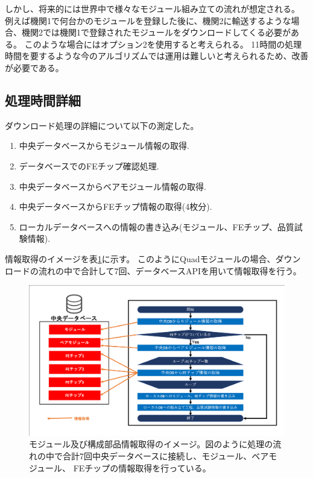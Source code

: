 しかし、将来的には世界中で様々なモジュール組み立ての流れが想定される。
例えば機関1で何台かのモジュールを登録した後に、機関2に輸送するような場合、機関2では機関1で登録されたモジュールをダウンロードしてくる必要がある。
このような場合にはオプション2を使用すると考えられる。
11時間の処理時間を要するような今のアルゴリズムでは運用は難しいと考えられるため、改善が必要である。

\subsection{処理時間詳細}
ダウンロード処理の詳細について以下の測定した。
\begin{enumerate}
  \item 中央データベースからモジュール情報の取得.
  \item データベースでのFEチップ確認処理.
  \item 中央データベースからベアモジュール情報の取得.
  \item 中央データベースからFEチップ情報の取得(4枚分).
  \item ローカルデータベースへの情報の書き込み(モジュール、FEチップ、品質試験情報).
\end{enumerate}

情報取得のイメージを表\ref{download_process_image}に示す。
このようにQuadモジュールの場合、ダウンロードの流れの中で合計して7回、データベースAPIを用いて情報取得を行う。
\begin{figure}[bpt]\centering
\includegraphics[width=15cm]{download_process_image}
\caption[モジュール及び構成部品情報取得のイメージ図]{モジュール及び構成部品情報取得のイメージ。図のように処理の流れの中で合計7回中央データベースに接続し、モジュール、ベアモジュール、 FEチップの情報取得を行っている。}
\label{download_process_image}
\end{figure}

